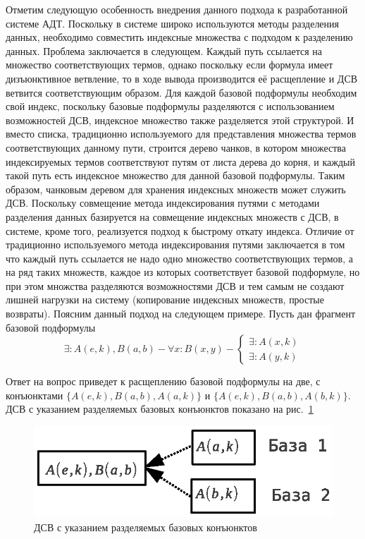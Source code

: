 Отметим следующую особенность внедрения данного подхода к разработанной системе АДТ. Поскольку в системе широко используются методы разделения данных, необходимо совместить индексные множества с подходом к разделению данных. Проблема заключается в следующем. Каждый путь ссылается на множество соответствующих термов, однако поскольку если формула имеет дизъюнктивное ветвление, то в ходе вывода производится её расщепление и ДСВ ветвится соответствующим образом. Для каждой базовой подформулы необходим свой индекс, поскольку базовые подформулы разделяются с использованием возможностей ДСВ, индексное множество также разделяется этой структурой. И вместо списка, традиционно используемого для представления множества термов соответствующих данному пути, строится дерево чанков, в котором множества индексируемых термов соответствуют путям от листа дерева до корня, и каждый такой путь есть индексное множество для данной базовой подформулы. Таким образом, чанковым деревом для хранения индексных множеств может служить ДСВ. Поскольку совмещение метода индексирования путями с методами разделения данных базируется на совмещение индексных множеств с ДСВ, в системе, кроме того, реализуется подход к быстрому откату индекса. Отличие от традиционно используемого метода индексирования путями заключается в том что каждый путь ссылается не надо одно множество соответствующих термов, а на ряд таких множеств, каждое из которых соответствует базовой подформуле, но при этом множства разделяются возможностями ДСВ и тем самым не создают лишней нагрузки на систему (копирование индексных множеств, простые возвраты). Поясним данный подход на следующем примере.
Пусть дан фрагмент базовой подформулы
$$
\exists: A(e,k),B(a,b) - \forall x: B(x,y) - \left\{
\begin{array}{lcl}
 \exists \colon A(x,k) \\
 \exists \colon A(y,k)
\end{array}
\right.
$$

Ответ на вопрос приведет к расщеплению базовой подформулы на две, с конъюнктами $\{A(e,k),B(a,b),A(a,k)\}$ и $\{A(e,k), B(a,b),A(b,k)\}$. ДСВ с указанием разделяемых базовых конъюнктов показано на рис.~\ref{fig:sharedindex}

\begin{figure}[h]
	\centering
	\includegraphics[width=0.4\linewidth]{pics/SharedIndex.eps}
	\caption{ДСВ с указанием разделяемых базовых конъюнктов}
	\label{fig:sharedindex}
\end{figure}


